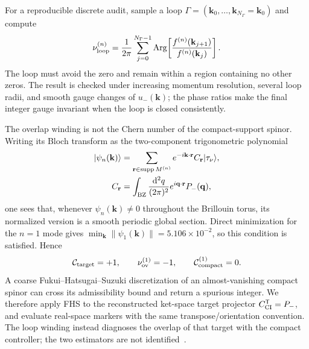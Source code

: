 For a reproducible discrete audit, sample a loop
\(\Gamma=(\mathbf k_0,\ldots,\mathbf k_{N_\Gamma}=\mathbf k_0)\) and compute
\begin{equation}
    \nu_{\rm loop}^{(n)}
    =\frac{1}{2\pi}\sum_{j=0}^{N_\Gamma-1}
      \operatorname{Arg}\!\left[
      \frac{f^{(n)}(\mathbf k_{j+1})}{f^{(n)}(\mathbf k_j)}\right].
    \label{eq:app-discrete-overlap-winding}
\end{equation}
The loop must avoid the zero and remain within a region containing no other
zeros.  The result is checked under increasing momentum resolution, several
loop radii, and smooth gauge changes of \(u_-(\mathbf k)\); the phase ratios
make the final integer gauge invariant when the loop is closed consistently.

The overlap winding is not the Chern number of the compact-support spinor.
Writing its Bloch transform as the two-component trigonometric polynomial
\begin{align}
    \lvert\psi_n(\mathbf k)\rangle
    &=\sum_{\mathbf r\in\operatorname{supp}M^{(n)}}
      e^{-i\mathbf k\cdot\mathbf r}C_{\mathbf r}\lvert\tau_\nu\rangle,
    \nonumber\\
    C_{\mathbf r}&=\int_{\rm BZ}\frac{\mathrm{d}^2q}{(2\pi)^2}
      e^{i\mathbf q\cdot\mathbf r}P_-(\mathbf q),
    \label{eq:app-compact-spinor}
\end{align}
one sees that, whenever \(\psi_n(\mathbf k)\neq0\) throughout the Brillouin
torus, its normalized version is a smooth periodic global section.  Direct
minimization for the \(n=1\) mode gives
\(\min_{\mathbf k}\|\psi_1(\mathbf k)\|=5.106\times10^{-2}\), so this
condition is satisfied.  Hence
\begin{equation}
    \mathcal C_{\rm target}=+1,
    \qquad \nu_{\rm ov}^{(1)}=-1,
    \qquad \mathcal C_{\rm compact}^{(1)}=0.
    \label{eq:app-three-topological-objects}
\end{equation}
A coarse Fukui--Hatsugai--Suzuki discretization of an almost-vanishing compact
spinor can cross its admissibility bound and return a spurious integer.  We
therefore apply FHS to the reconstructed ket-space target projector
\(C_{\rm CI}^{\mathsf T}=P_-\), and evaluate real-space markers with the same
transpose/orientation convention.  The loop winding instead diagnoses the
overlap of that target with the compact controller; the two estimators are not
identified~\cite{FukuiHatsugaiSuzuki2005}.


